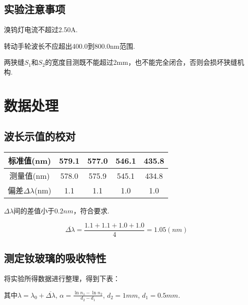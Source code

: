 \documentclass{thureport}
\begin{document}
\subsection{实验注意事项}
\begin{clause}
	\item 溴钨灯电流不超过2.50A.
	\item 转动手轮波长不应超出400.0到800.0nm范围.
	\item 两狭缝$S_1$和$S_2$的宽度目测既不能超过2mm，也不能完全闭合，否则会损坏狭缝机构.
\end{clause}

\section{数据处理}
\subsection{波长示值的校对}
\begin{table}[htbp]
    \centering
      \begin{tabular}{|c|c|c|c|c|}
      \hline
      标准值(nm)   & 579.1  & 577.0  & 546.1  & 435.8  \bigstrut\\
      \hline
      测量值(nm)   & 578.0  & 575.9  & 545.1  & 434.8  \bigstrut\\
      \hline
      偏差$\Delta\lambda$(nm)    & 1.1   & 1.1   & 1.0   & 1.0  \bigstrut\\
      \hline
      \end{tabular}%
  \end{table}%

$\Delta\lambda$间的差值小于$0.2nm$，符合要求.

$$\overline{\Delta\lambda}=\frac{1.1+1.1+1.0+1.0}{4}=1.05(nm)$$

\subsection{测定钕玻璃的吸收特性}
将实验所得数据进行整理，得到下表：

其中$\lambda=\lambda_0+\overline{\Delta\lambda}$, $\alpha=\frac{\ln{n_1}-\ln{n_2}}{d_2-d_1}$, $d_2=1mm$, $d_1=0.5mm$.
\end{document}
